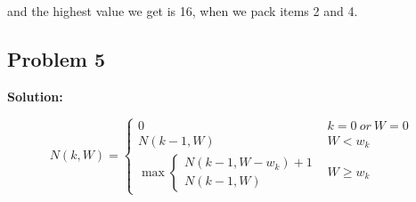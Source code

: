 \documentclass[12pt,a4paper]{article}
\newcommand{\solution}{\noindent\textbf{Solution:}\\\indent}
\begin{document}
and the highest value we get is 16, when we pack items 2 and 4.

\subsection*{Problem 5}
\solution

\begin{equation*}
    N(k,W) = \begin{cases}
    0 & k=0\ or\ W=0 \\
    N(k-1,W) & W<w_k \\
    \max\begin{cases}
        N(k-1, W-w_k)+1 \\
        N(k-1, W)
    \end{cases} & W\geq w_k
    \end{cases}
\end{equation*}
\end{document}
